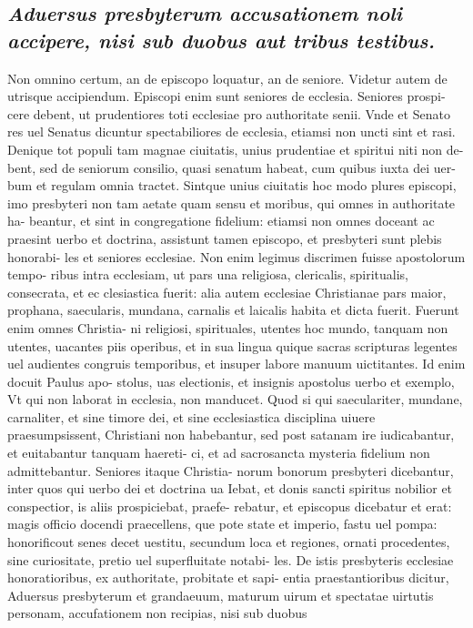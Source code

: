 \documentclass{article}
\begin{document}
\begin{pages}
\subsection*{\textit{Aduersus presbyterum accusationem noli accipere, nisi sub duobus aut tribus testibus. }}\pstart Non omnino certum, an de episcopo loquatur, an de seniore. Videtur autem de utrisque accipiendum. Episcopi enim sunt seniores de ecclesia. Seniores prospi- cere debent, ut prudentiores toti ecclesiae pro authoritate senii. Vnde et Senato res uel Senatus dicuntur spectabiliores de ecclesia, etiamsi non uncti sint et rasi. Denique tot populi tam magnae ciuitatis, unius prudentiae et spiritui niti non de- bent, sed de seniorum consilio, quasi senatum habeat, cum quibus iuxta dei uer- bum et regulam omnia tractet. Sintque unius ciuitatis hoc modo plures episcopi, imo presbyteri non tam aetate quam sensu et moribus, qui omnes in authoritate ha- beantur, et sint in congregatione fidelium: etiamsi non omnes doceant ac praesint uerbo et doctrina, assistunt tamen episcopo, et presbyteri sunt plebis honorabi- les et seniores ecclesiae. Non enim legimus discrimen fuisse apostolorum tempo- ribus intra ecclesiam, ut pars una religiosa, clericalis, spiritualis, consecrata, et ec clesiastica fuerit: alia autem ecclesiae Christianae pars maior, prophana, saecularis, mundana, carnalis et laicalis habita et dicta fuerit. Fuerunt enim omnes Christia- ni religiosi, spirituales, utentes hoc mundo, tanquam non utentes, uacantes piis operibus, et in sua lingua quique sacras scripturas legentes uel audientes congruis temporibus, et insuper labore manuum uictitantes. Id enim docuit Paulus apo- stolus, uas electionis, et insignis apostolus uerbo et exemplo, Vt qui non laborat in ecclesia, non manducet. Quod si qui saeculariter, mundane, carnaliter, et sine timore dei, et sine ecclesiastica disciplina uiuere praesumpsissent, Christiani non habebantur, sed post satanam ire iudicabantur, et euitabantur tanquam haereti- ci, et ad sacrosancta mysteria fidelium non admittebantur. Seniores itaque Christia- norum bonorum presbyteri dicebantur, inter quos qui uerbo dei et doctrina ua Iebat, et donis sancti spiritus nobilior et conspectior, is aliis prospiciebat, praefe- rebatur, et episcopus dicebatur et erat: magis officio docendi praecellens, que pote state et imperio, fastu uel pompa: honorificout senes decet uestitu, secundum loca et regiones, ornati procedentes, sine curiositate, pretio uel superfluitate notabi- les. De istis presbyteris ecclesiae honoratioribus, ex authoritate, probitate et sapi- entia praestantioribus dicitur, Aduersus presbyterum et grandaeuum, maturum uirum et spectatae uirtutis personam, accufationem non recipias, nisi sub duobus  \pend

\end{pages}
\end{document}
